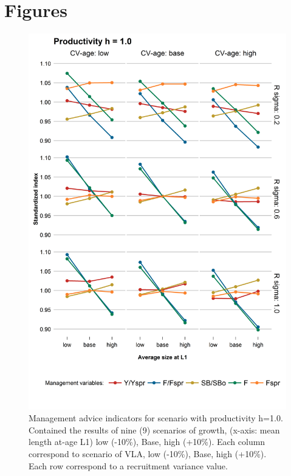 \clearpage
\section{Figures}


\begin{figure}[ht]
	\begin{center}
\includegraphics[width=0.70\columnwidth]{figures/steepness-10-var.png}
  \end{center}
\caption{Management advice indicators for scenario with productivity h=1.0. Contained the results of nine (9) scenarios of growth, (x-axis: mean length at-age L1) low (-10\%), Base, high (+10\%). Each column correspond to scenario of VLA, low (-10\%), Base, high (+10\%). Each row correspond to a recruitment variance value.}
\label{figure1}
\end{figure}


